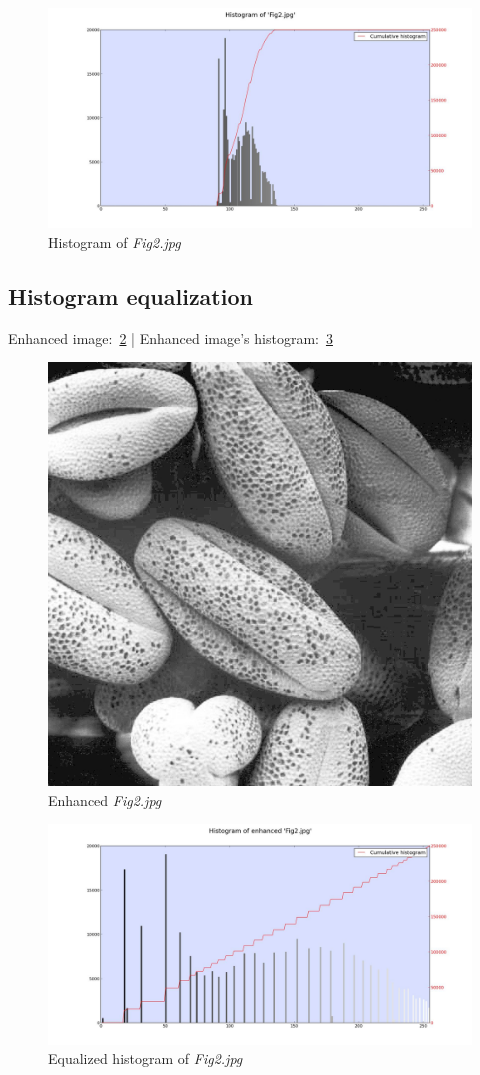     \begin{figure}[!htb]\centering
        \includegraphics[width=\linewidth]{./images/1/Histogram_Fig2.jpg}
        \caption{Histogram of \textit{Fig2.jpg}}\label{diagram:hist_fig2}
    \end{figure}

    \pagebreak
    \subsection{Histogram equalization}

    Enhanced image:~\ref{diagram:enhanced_fig2} |
    Enhanced image's histogram:~\ref{diagram:equal_hist_fig2}

    \begin{figure}[!htb]\centering
        \includegraphics[width=0.5\linewidth]{./images/1/Enhanced_Fig2.jpg}
        \caption{Enhanced \textit{Fig2.jpg}}\label{diagram:enhanced_fig2}
    \end{figure}

    \begin{figure}[!htb]\centering
        \includegraphics[width=\linewidth]{./images/1/Equalized_Histogram_Fig2.jpg}
        \caption{Equalized histogram of \textit{Fig2.jpg}}\label{diagram:equal_hist_fig2}
    \end{figure}
